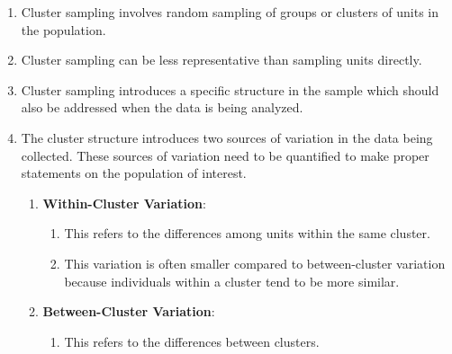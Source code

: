 \begin{enumerate}[itemsep=0.2cm]
    \item Cluster sampling involves random sampling of groups or clusters of units in the population.
    \hfill \cite{statistics/book/Statistics-for-Data-Scientists/Maurits-Kaptein}

    \item Cluster sampling can be less representative than sampling units directly.
    \hfill \cite{statistics/book/Statistics-for-Data-Scientists/Maurits-Kaptein}

    \item Cluster sampling introduces a specific structure in the sample which should also be addressed when the data is being analyzed. 
    \hfill \cite{statistics/book/Statistics-for-Data-Scientists/Maurits-Kaptein}
    
    \item The cluster structure introduces two sources of variation in the data being collected. These sources of variation need to be quantified to make proper statements on the population of interest.
    \hfill \cite{statistics/book/Statistics-for-Data-Scientists/Maurits-Kaptein}
    \begin{enumerate}[itemsep=0.1cm]
        \item \textbf{Within-Cluster Variation}:\label{Sampling Plans/Representative Sampling/Cluster Sampling/Within-Cluster Variation}
        \hfill \cite{common/online/chatgpt}
        \begin{enumerate}
            \item This refers to the differences among units within the same cluster.
            \hfill \cite{common/online/chatgpt}

            \item This variation is often smaller compared to between-cluster variation because individuals within a cluster tend to be more similar.
            \hfill \cite{common/online/chatgpt}

        \end{enumerate}

        \item \textbf{Between-Cluster Variation}:\label{Sampling Plans/Representative Sampling/Cluster Sampling/Between-Cluster Variation}
        \hfill \cite{common/online/chatgpt}
        \begin{enumerate}
            \item This refers to the differences between clusters.
            \hfill \cite{common/online/chatgpt}


\end{enumerate}
\end{enumerate}
\end{enumerate}
